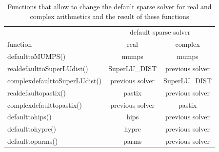 \documentclass[a4paper,twoside,12pt]{book}
\begin{document}
\begin{table}[ht!]
\begin{tabular}{|l|c|c|}\hline
                                  & \multicolumn{2}{|c|}{default sparse solver}  \\
function                &         real    &  complex \\ \hline
defaulttoMUMPS()  &   mumps   &  mumps\\
realdefaulttoSuperLUdist()           & SuperLU\_DIST  & previous solver \\
complexdefaulttoSuperLUdist()   &  previous solver & SuperLU\_DIST \\
realdefaultopastix()                        &  pastix & previous solver \\
complexdefaulttopastix() &previous solver & pastix \\
defaulttohips()      &  hips & previous solver \\
defaulttohypre()   & hypre & previous solver \\
defaulttoparms() & parms & previous solver \\
\hline
\end{tabular}
\caption{Functions that allow to change the default sparse solver for real and complex arithmetics and the result of  these functions \label{func.sparse.solver}}
\end{table}
\end{document}
